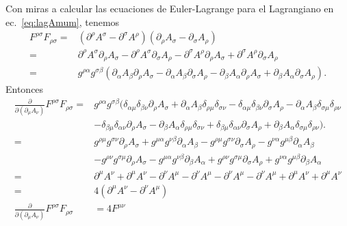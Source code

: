 Con miras a calcular  las ecuaciones de Euler-Lagrange para el Lagrangiano en
ec.~\eqref{eq:lagAmum}, tenemos
\begin{align}
F^{\rho\sigma}F_{\rho\sigma}=&(\partial^\rho A^\sigma-\partial^\sigma A^\rho)(\partial_\rho A_\sigma-\partial_\sigma A_\rho)\nonumber\\
=&\partial^\rho A^\sigma\partial_\rho A_\sigma-\partial^\rho A^\sigma\partial_\sigma A_\rho-\partial^\sigma A^\rho\partial_\rho A_\sigma+\partial^\sigma A^\rho\partial_\sigma
A_\rho\nonumber\\
=&g^{\rho\alpha}g^{\sigma\beta}(\partial_\alpha A_\beta\partial_\rho A_\sigma-\partial_\alpha A_\beta\partial_\sigma A_\rho-\partial_\beta A_\alpha\partial_\rho A_\sigma+\partial_\beta A_\alpha\partial_\sigma A_\rho).\nonumber
\end{align}
Entonces
\begin{align}
  \frac{\partial}{\partial(\partial_\mu A_\nu)}F^{\rho\sigma}F_{\rho\sigma}=&g^{\rho\alpha}g^{\sigma\beta}(\delta_{\alpha\mu}\delta_{\beta\nu}\partial_\rho
  A_\sigma+\partial_\alpha A_\beta\delta_{\rho\mu} \delta_{\sigma\nu}-\delta_{\alpha\mu}\delta_{\beta\nu}\partial_\sigma A_\rho-\partial_\alpha A_\beta\delta_{\sigma\mu}\delta_{\rho\nu}\nonumber\\
&-\delta_{\beta\mu}\delta_{\alpha\nu}\partial_\rho A_\sigma-\partial_\beta A_\alpha\delta_{\rho\mu}\delta_{\sigma\nu}+\delta_{\beta\mu}\delta_{\alpha\nu}\partial_\sigma A_\rho+\partial_\beta
A_\alpha\delta_{\sigma\mu}\delta_{\rho\nu}).\nonumber\\
=&  g^{\rho\mu}g^{\sigma\nu}\partial_\rho A_\sigma+g^{\mu\alpha}g^{\nu\beta}\partial_\alpha A_\beta-g^{\rho\mu}g^{\sigma\nu}\partial_\sigma A_\rho-g^{\nu\alpha}g^{\mu\beta}\partial_\alpha A_\beta\nonumber\\
 &-g^{\rho\nu}g^{\sigma\mu}\partial_\rho A_\sigma-g^{\mu\alpha}g^{\nu\beta}\partial_\beta A_\alpha+g^{\rho\nu}g^{\sigma\mu}\partial_\sigma A_\rho+g^{\nu\alpha}g^{\mu\beta}\partial_\beta A_\alpha\nonumber\\
=&  \partial^\mu A^\nu+\partial^\mu A^\nu-\partial^\nu A^\mu-\partial^\nu A^\mu-\partial^\nu A^\mu-\partial^\nu A^\mu+\partial^\mu A^\nu+\partial^\mu A^\nu\nonumber\\
=&4(\partial^\mu A^\nu-\partial^\nu A^\mu) \nonumber\\
\label{eq:dddmufmunu2}
\frac{\partial}{\partial(\partial_\mu A_\nu)}F^{\rho\sigma}F_{\rho\sigma}&=4F^{\mu\nu}
\end{align}

